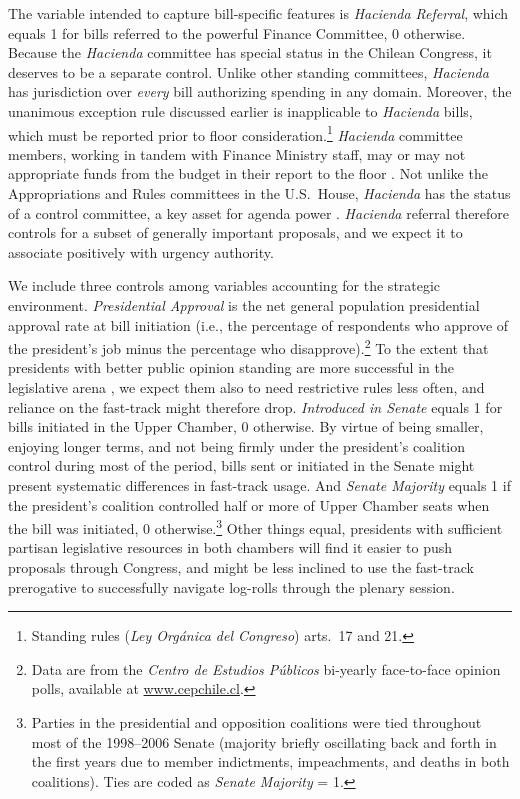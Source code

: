 \documentclass[letter,12pt]{article}
\begin{document}
The variable intended to capture bill-specific features is \emph{Hacienda Referral}, which equals 1 for bills referred to the powerful Finance Committee, 0 otherwise. Because the \emph{Hacienda} committee has special status in the Chilean Congress, it deserves to be a separate control. Unlike other standing committees, \emph{Hacienda} has jurisdiction over \emph{every} bill authorizing spending in any domain. Moreover, the unanimous exception rule discussed earlier is inapplicable to \emph{Hacienda} bills, which must be reported prior to floor consideration.\footnote{Standing rules (\emph{Ley Orgánica del Congreso}) arts.\ 17 and 21.} \emph{Hacienda} committee members, working in tandem with Finance Ministry staff, may or may not appropriate funds from the budget in their report to the floor \citep{aleman.navia.UrgChi.2009}. Not unlike the Appropriations and Rules committees in the U.S.\ House, \emph{Hacienda} has the status of a control committee, a key asset for agenda power \citep{kiewiet.mccubbins.1991}. \emph{Hacienda} referral therefore controls for a subset of generally important proposals, and we expect it to associate positively with urgency authority.

We include three controls among variables accounting for the strategic environment. \emph{Presidential Approval} is the net general population presidential approval rate at bill initiation (i.e., the percentage of respondents who approve of the president's job minus the percentage who disapprove).\footnote{Data are from the \emph{Centro de Estudios Públicos} bi-yearly face-to-face opinion polls, available at \url{www.cepchile.cl}.} To the extent that presidents with better public opinion standing are more successful in the legislative arena \citep{bond.fleisher.1990,aleman.navia.UrgChi.2009}, we expect them also to need restrictive rules less often, and reliance on the fast-track might therefore drop. \emph{Introduced in Senate} equals 1 for bills initiated in the Upper Chamber, 0 otherwise. By virtue of being smaller, enjoying longer terms, and not being firmly under the president's coalition control during most of the period, bills sent or initiated in the Senate might present systematic differences in fast-track usage. And \emph{Senate Majority} equals 1 if the president's coalition controlled half or more of Upper Chamber seats when the bill was initiated, 0 otherwise.\footnote{Parties in the presidential and opposition coalitions were tied throughout most of the 1998--2006 Senate (majority briefly oscillating back and forth in the first years due to member indictments, impeachments, and deaths in both coalitions). Ties are coded as \emph{Senate Majority} = 1.} Other things equal, presidents with sufficient partisan legislative resources in both chambers will find it easier to push proposals through Congress, and might be less inclined to use the fast-track prerogative to successfully navigate log-rolls through the plenary session.
\end{document}
